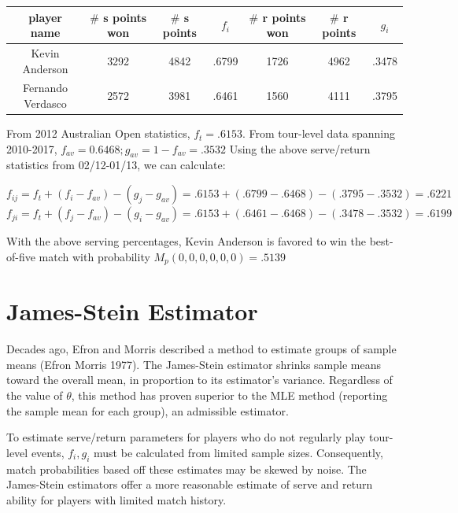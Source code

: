\documentclass[chapterprefix=false]{report}
\begin{document}
\begin{center}
\begin{tabular}{ |c|c|c|c|c|c|c| } 
 \hline
 player name & $\#$ s points won & $\#$ s points
&$f_i$ & $\#$ r points won & $\#$ r points & $g_i$ \\ 
 \hline
 Kevin Anderson & 3292 & 4842 & .6799 & 1726 & 4962 & .3478\\ 
 \hline
 Fernando Verdasco & 2572 & 3981 & .6461 & 1560 & 4111 & .3795\\ 
 \hline
\end{tabular}
\end{center}

From 2012 Australian Open statistics, $f_t=.6153$. From tour-level data spanning 2010-2017, $f_{av} = 0.6468; g_{av} = 1-f_{av} =.3532$ Using the above serve/return statistics from 02/12-01/13, we can calculate:

\begin{center}
$f_{ij} = f_t + (f_i-f_{av})-(g_j-g_{av}) = .6153 + (.6799-.6468) - (.3795-.3532) = .6221$
$f_{ji} = f_t + (f_j-f_{av})-(g_i-g_{av}) = .6153 + (.6461-.6468) - (.3478-.3532) = .6199$
\end{center}

With the above serving percentages, Kevin Anderson is favored to win the best-of-five match with probability $M_p(0,0,0,0,0,0) = .5139$


\section{James-Stein Estimator}
Decades ago, Efron and Morris described a method to estimate groups of sample means (Efron Morris 1977). The James-Stein estimator shrinks sample means toward the overall mean, in proportion to its estimator's variance. Regardless of the value of $\theta$, this method has proven superior to the MLE method (reporting the sample mean for each group), an admissible estimator.

To estimate serve/return parameters for players who do not regularly play tour-level events, $f_i,g_i$ must be calculated from limited sample sizes. Consequently, match probabilities based off these estimates may be skewed by noise. The James-Stein estimators offer a more reasonable estimate of serve and return ability for players with limited match history. 

\end{document}
